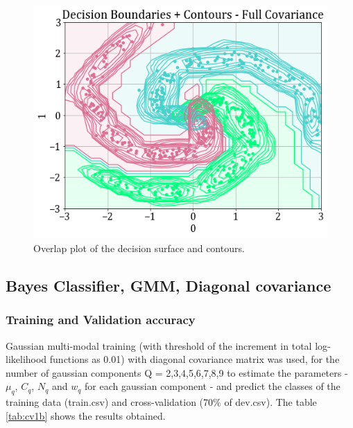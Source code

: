 \documentclass[11pt,a4paper]{article}
\begin{document}
\vspace{-1em}
\begin{figure}[H]
    \centering
    \includegraphics[scale=0.5]{images/1B/1b_full_ds_contours.png}
    \caption{Overlap plot of the decision surface and contours.}
\end{figure}

\subsection{Bayes Classifier, GMM, Diagonal covariance}
\subsubsection{Training and Validation accuracy}
Gaussian multi-modal training (with threshold of the increment in total log-likelihood functions as 0.01) with diagonal covariance matrix was used, for the number of gaussian components Q = {2,3,4,5,6,7,8,9} to estimate the parameters - $\mu_q$, $C_q$, $N_q$ and $w_q$ for each gaussian component - and predict the classes of the training data (train.csv) and cross-validation (70\% of dev.csv). The table \ref{tab:cv1b} shows the results obtained.

\end{document}
